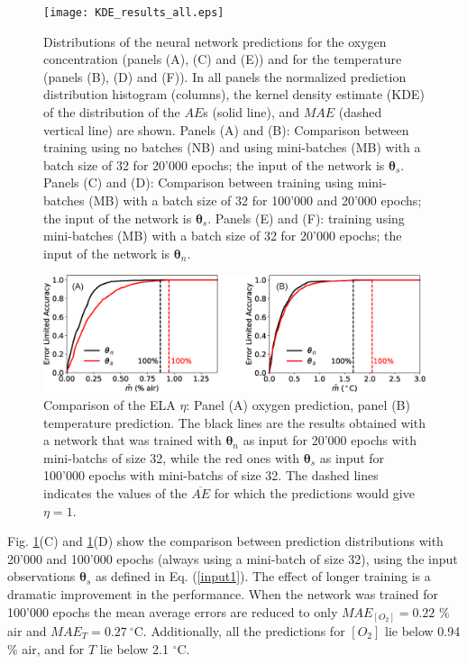 \documentclass[final,5p,times,twocolumn]{elsarticle}
\begin{document}
\begin{figure}[htbp]
\centering
\texttt{[image: KDE\_results\_all.eps]}
\caption{Distributions of the neural network predictions for the oxygen concentration (panels (A), (C) and (E)) and for the temperature (panels (B), (D) and (F)). In all panels the normalized prediction distribution histogram (columns), the kernel density estimate (KDE) of the distribution of the $AE$s (solid line), and $MAE$ (dashed vertical line) are shown. Panels (A) and (B): Comparison between training using no batches (NB) and using mini-batches (MB) with a batch size of 32 for 20'000 epochs; the input of the network is ${\pmb \theta}_s$. Panels (C) and (D): Comparison between training using mini-batches (MB) with a batch size of 32 for 100'000 and 20'000 epochs; the input of the network is ${\pmb \theta}_s$. Panels (E) and (F): 
training using mini-batches (MB) with a batch size of 32 for 20'000 epochs; the input of the network is ${\pmb \theta}_n$.}
\label{fig:KDE_results_all}
\end{figure}

\begin{figure}[t!]
\centering
\includegraphics[width=13.5 cm]{ELA_comparison_O2_T.eps}
\caption{Comparison of the ELA $\eta$: Panel (A) oxygen prediction, panel (B) temperature prediction. The black lines are the results obtained with a network that was trained with ${\pmb \theta}_n$ as input for 20'000 epochs with mini-batchs of size 32, while the red ones with ${\pmb \theta}_s$ as input for 100'000 epochs with mini-batchs of size 32. The dashed lines indicates the values of the $\overline{AE}$ for which the predictions would give $\eta=1$.}
\label{fig:ELA_result_comparison}
\end{figure}

Fig. \ref{fig:KDE_results_all}(C) and \ref{fig:KDE_results_all}(D) show the comparison between prediction distributions with 20'000 and 100'000 epochs (always using a mini-batch of size 32), using the input observations ${\pmb \theta}_s$ as defined in Eq. (\ref{input1}). The effect of longer training is a dramatic improvement in the performance. When the network was trained for 100'000 epochs the mean average errors are reduced to only $MAE_{[O_2]}=0.22$ \% air and $MAE_{T}=0.27  \ ^\circ$C. Additionally, all the predictions for $[O_2]$ lie below 0.94 \% air, and for $T$ lie below 2.1 $^\circ$C.
\end{document}
